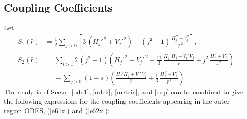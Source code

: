 \documentclass[12pt,prb,aps]{revtex4-1}
\begin{document}
\subsection{Coupling Coefficients}
Let
\begin{align}
S_1(\hat{r})&= \frac{1}{2}\sum_{j>0}\left[3\,(H_j'^{\,2}+V_j'^{\,2}) - (j^2-1)\,\frac{H_j^{\,2}+V_j^{\,2}}{\hat{r}^{\,2}}\right],\\[0.5ex]
S_2(\hat{r})&= \sum_{j>1}2\,(j^2-1)\left(H_j'^{\,2}+V_j'^{\,2}-\frac{11}{3}\,\frac{H_j'\,H_j+V_j'\,V_j}{\hat{r}}+j^2\,\frac{H_j^{\,2}+V_j^{\,2}}{\hat{r}^{\,2}}\right)\nonumber\\[0.5ex]&\phantom{=} -\sum_{j>0}(1-s)\left(\frac{H_j'\,H_j+V_j'\,V_j}{\hat{r}}+\frac{1}{3}\,\frac{H_j^{\,2}+V_j^{\,2}}{\hat{r}^{\,2}}\right).
\end{align}
The analysis of Sects.~\ref{ode1}, \ref{ode2}, \ref{metric}, and \ref{exp} can be combined to give
the following expressions for the coupling coefficients appearing in the outer region ODES, (\ref{e61x}) and (\ref{e62x}):\,\cite{am1}
\end{document}
